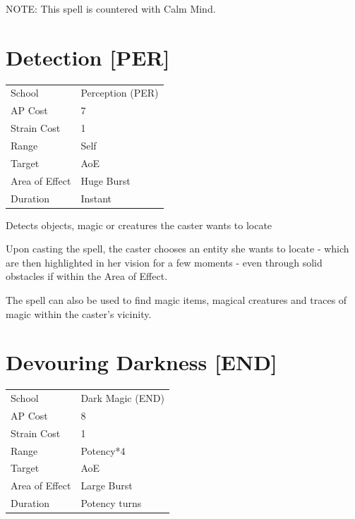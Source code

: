 \documentclass[11pt,a4paper,twocolumn]{book}
\begin{document}
NOTE: This spell is countered with Calm Mind.


\section*{Detection [PER]}
{
	\begin{tabu} to 75mm{| X[l,4] | X[l,7] |}
		\hline
		School 			& Perception (PER) 		\\
        AP Cost	      	& 7 					\\
        Strain Cost     & 1 					\\
        Range     		& Self					\\
        Target      	& AoE 					\\
        Area of Effect  & Huge Burst 	 		\\
        Duration     	& Instant 				\\ \hline
	\end{tabu}
		
}

\medskip

Detects objects, magic or creatures the caster wants to locate

Upon casting the spell, the caster chooses an entity she wants to locate - which are then highlighted in her vision for a few moments - even through solid obstacles if within the Area of Effect.

The spell can also be used to find magic items, magical creatures and traces of magic within the caster's vicinity.

\vfill


\section*{Devouring Darkness [END]}
{
	\begin{tabu} to 75mm{| X[l,4] | X[l,7] |}
		\hline
		School 			& Dark Magic (END) 	\\
        AP Cost	      	& 8 				\\
        Strain Cost     & 1 				\\
        Range     		& Potency*4 		\\
        Target      	& AoE				\\
        Area of Effect  & Large Burst  	 	\\
        Duration     	& Potency turns 	\\ \hline
	\end{tabu}
		
}
\end{document}

